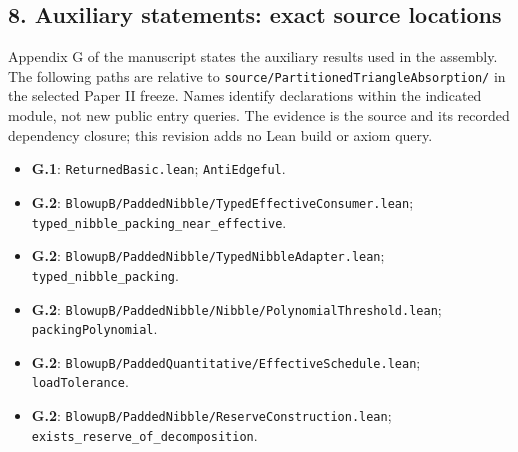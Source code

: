 \documentclass[english,11pt,a4paper]{article}
\providecommand{\tightlist}{\setlength{\itemsep}{0pt}\setlength{\parskip}{0pt}}
\begin{document}
\subsection{8. Auxiliary statements: exact source locations}\label{auxiliary-statements-exact-source-locations}

Appendix G of the manuscript states the auxiliary results used in the assembly. The following paths are relative to \texttt{source/\allowbreak{}Parti\allowbreak{}tioned\allowbreak{}Triang\allowbreak{}le\allowbreak{}Absorption\allowbreak{}/\allowbreak{}} in the selected Paper II freeze. Names identify declarations within the indicated module, not new public entry queries. The evidence is the source and its recorded dependency closure; this revision adds no Lean build or axiom query.

\begin{itemize}
\tightlist
\item
  \textbf{G.1}: \texttt{Returned\allowbreak{}Basi\allowbreak{}c.\allowbreak{}lean}; \texttt{Anti\allowbreak{}Edgeful}.
\item
  \textbf{G.2}: \texttt{Blowup\allowbreak{}B/\allowbreak{}Padd\allowbreak{}ed\allowbreak{}Nibble/\allowbreak{}Typ\allowbreak{}ed\allowbreak{}Effective\allowbreak{}C\allowbreak{}onsumer.\allowbreak{}lean\allowbreak{}}; \texttt{typed\_\allowbreak{}nibble\allowbreak{}\_\allowbreak{}packing\_\allowbreak{}nea\allowbreak{}r\_\allowbreak{}effective}.
\item
  \textbf{G.2}: \texttt{Blowup\allowbreak{}B/\allowbreak{}Padd\allowbreak{}ed\allowbreak{}Nibble/\allowbreak{}Typ\allowbreak{}ed\allowbreak{}Nibble\allowbreak{}Adap\allowbreak{}ter.\allowbreak{}lean}; \texttt{typed\_\allowbreak{}nibble\allowbreak{}\_\allowbreak{}packing}.
\item
  \textbf{G.2}: \texttt{Blowup\allowbreak{}B/\allowbreak{}Padd\allowbreak{}ed\allowbreak{}Nibble/\allowbreak{}Nib\allowbreak{}ble/\allowbreak{}Polynomi\allowbreak{}al\allowbreak{}Threshold.\allowbreak{}\allowbreak{}lean}; \texttt{packing\allowbreak{}Polyn\allowbreak{}omial}.
\item
  \textbf{G.2}: \texttt{Blowup\allowbreak{}B/\allowbreak{}Padd\allowbreak{}ed\allowbreak{}Quantitati\allowbreak{}ve/\allowbreak{}Effective\allowbreak{}\allowbreak{}Schedule.\allowbreak{}lea\allowbreak{}n}; \texttt{load\allowbreak{}Toleranc\allowbreak{}e}.
\item
  \textbf{G.2}: \texttt{Blowup\allowbreak{}B/\allowbreak{}Padd\allowbreak{}ed\allowbreak{}Nibble/\allowbreak{}Res\allowbreak{}erve\allowbreak{}Construc\allowbreak{}tion.\allowbreak{}lean}; \texttt{exists\_\allowbreak{}reser\allowbreak{}ve\_\allowbreak{}of\_\allowbreak{}decomp\allowbreak{}osition}.

\end{itemize}
\end{document}
